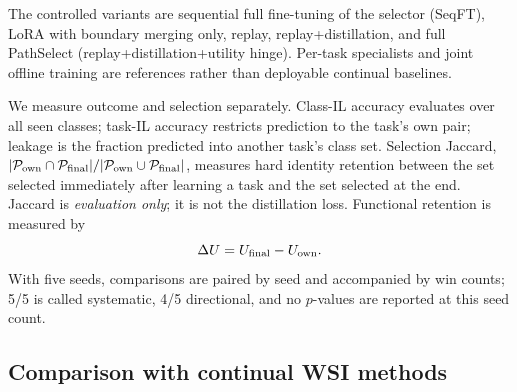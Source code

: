 \documentclass{article}
\newcommand{\Psel}{\mathcal{P}}
\begin{document}
The controlled variants are sequential full fine-tuning of the selector (SeqFT), LoRA with boundary merging only, replay, replay+distillation, and full PathSelect (replay+distillation+utility hinge).
Per-task specialists and joint offline training are references rather than deployable continual baselines.

We measure outcome and selection separately.
Class-IL accuracy evaluates over all seen classes; task-IL accuracy restricts prediction to the task's own pair; leakage is the fraction predicted into another task's class set.
Selection Jaccard, $|\Psel_{\rm own}\cap\Psel_{\rm final}|/|\Psel_{\rm own}\cup\Psel_{\rm final}|$, measures hard identity retention between the set selected immediately after learning a task and the set selected at the end.
Jaccard is \emph{evaluation only}; it is not the distillation loss.
Functional retention is measured by
\[
\Delta U=U_{\rm final}-U_{\rm own}.
\]
With five seeds, comparisons are paired by seed and accompanied by win counts; 5/5 is called systematic, 4/5 directional, and no $p$-values are reported at this seed count.

\subsection{Comparison with continual WSI methods}
\label{ssec:sota}
\end{document}

